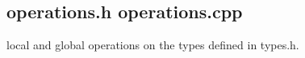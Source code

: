\subsection{operations.h operations.cpp}
local and global operations on the types defined in types.h. 